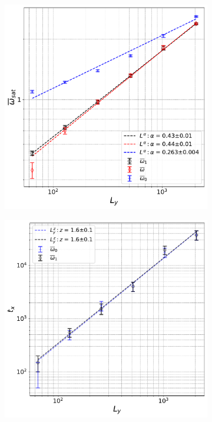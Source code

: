 \begin{figure}[!h]
    \hspace*{-1.5cm}
    \begin{subfigure}{.55\textwidth}
      \centering
      \includegraphics[width=1\textwidth]{omegavsL.pdf}
      \caption{}
    \end{subfigure}
    \begin{subfigure}{.57\textwidth}
      \centering
      \includegraphics[width=1\textwidth]{txvsL.pdf}

\end{subfigure}
\end{figure}
